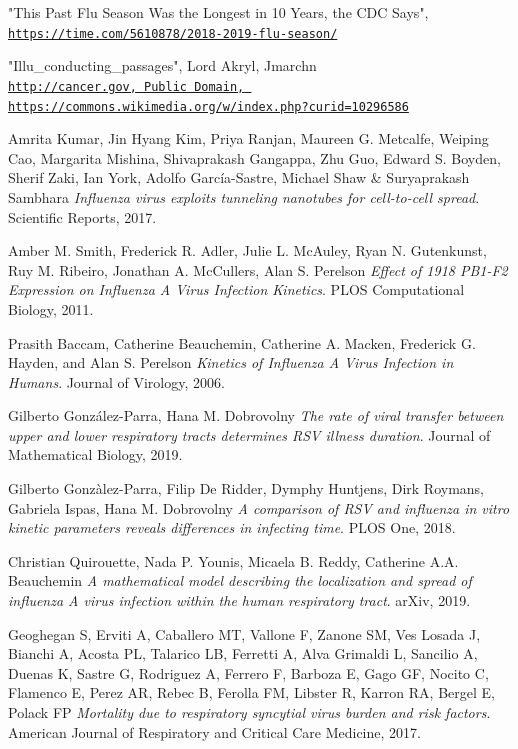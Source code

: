 \documentclass[a4paper]{article}
\begin{document}
\begin{thebibliography}{9}
"This Past Flu Season Was the Longest in 10 Years, the CDC Says",
\\
\texttt{\url{https://time.com/5610878/2018-2019-flu-season/}}

"Illu\_conducting\_passages",
Lord Akryl, Jmarchn
\\
\texttt{\url{http://cancer.gov, Public Domain, https://commons.wikimedia.org/w/index.php?curid=10296586}}

Amrita Kumar, Jin Hyang Kim, Priya Ranjan, Maureen G. Metcalfe, Weiping Cao,
Margarita Mishina, Shivaprakash Gangappa, Zhu Guo, Edward S. Boyden, Sherif Zaki,
Ian York, Adolfo García-Sastre, Michael Shaw \& Suryaprakash Sambhara
\textit{Influenza virus exploits tunneling nanotubes for cell-to-cell spread}. 
Scientific Reports, 2017.

Amber M. Smith, Frederick R. Adler, Julie L. McAuley, Ryan N. Gutenkunst, Ruy M. Ribeiro, Jonathan A. McCullers, Alan S. Perelson
\textit{Effect of 1918 PB1-F2 Expression on Influenza A Virus Infection Kinetics}. 
PLOS Computational Biology, 2011.

Prasith Baccam, Catherine Beauchemin, Catherine A. Macken, Frederick G. Hayden, and Alan S. Perelson
\textit{Kinetics of Influenza A Virus Infection in Humans}. 
Journal of Virology, 2006.

Gilberto González-Parra, Hana M. Dobrovolny
\textit{The rate of viral transfer between upper and lower
respiratory tracts determines RSV illness duration}. 
Journal of Mathematical Biology, 2019.

Gilberto Gonzàlez-Parra, Filip De Ridder, Dymphy Huntjens, Dirk Roymans, Gabriela Ispas, Hana M. Dobrovolny
\textit{A comparison of RSV and influenza in vitro kinetic
parameters reveals differences in infecting time}. 
PLOS One, 2018.

Christian Quirouette, Nada P. Younis, Micaela B. Reddy, Catherine A.A. Beauchemin
\textit{A mathematical model describing the localization and spread of
influenza A virus infection within the human respiratory tract}. 
arXiv, 2019.

Geoghegan S, Erviti A, Caballero MT, Vallone F, Zanone SM, Ves Losada J, Bianchi A, Acosta PL, Talarico LB, Ferretti A, Alva Grimaldi L, Sancilio A, Duenas K, Sastre G, Rodriguez A, Ferrero F, Barboza E, Gago GF, Nocito C, Flamenco E, Perez AR, Rebec B, Ferolla FM, Libster R, Karron RA, Bergel E, Polack FP
\textit{Mortality due to respiratory syncytial virus burden and risk factors}. 
American Journal of Respiratory and Critical Care Medicine, 2017.


\end{thebibliography}
\end{document}
